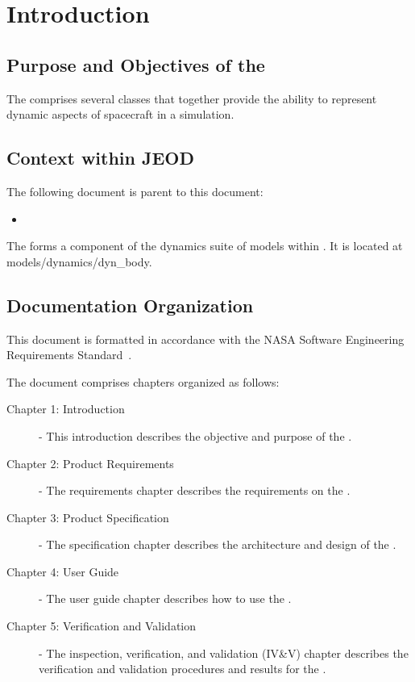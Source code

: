 \chapter{Introduction}
\label{ch:intro}

\section{Purpose and Objectives of the \ModelDesc}
The \ModelDesc comprises several classes that together provide the ability
to represent dynamic aspects of spacecraft in a simulation.


\section{Context within JEOD}
The following document is parent to this document:
\begin{itemize}
\item \hyperJEOD
\end{itemize}


The \ModelDesc forms a component of the dynamics suite of
models within \JEODid. It is located at
models/dynamics/dyn\_body.




\section{Documentation Organization}
This document is formatted in accordance with the
NASA Software Engineering Requirements Standard~\cite{NASA:SWE}.

The document comprises chapters organized as follows:

\begin{description}

\item[Chapter 1: Introduction] -
This introduction describes the objective and purpose of the \ModelDesc.

\item[Chapter 2: Product Requirements] -
The requirements chapter describes the requirements on the \ModelDesc.

\item[Chapter 3: Product Specification] -
The specification chapter describes
the architecture and design of the \ModelDesc.

\item[Chapter 4: User Guide] -
The user guide chapter describes
how to use the \ModelDesc.

\item[Chapter 5: Verification and Validation] -
The inspection, verification, and validation (IV\&V) chapter describes
the verification and validation procedures and results for the \ModelDesc.

\end{description}
